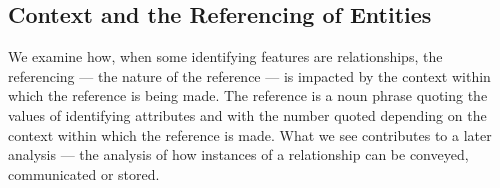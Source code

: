 \begin{oldtt}
\subsection{Context and the Referencing of Entities}
\mynote
We examine how,  when some identifying features are relationships, the referencing 
--- the nature of the reference ---   
is impacted by the context within which the reference is being made. 
The reference is  a noun phrase quoting the values of identifying attributes
and with the number quoted depending on 
the context within which the reference is made.
What we see contributes to a later analysis --- the analysis of  how 
instances of a relationship can be conveyed, communicated or stored.
\end{oldtt}
